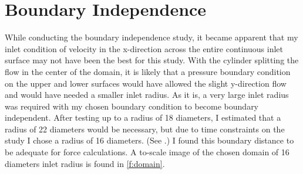 \documentclass[10pt,english]{article}
\begin{document}
\section{Boundary Independence}

While conducting the boundary independence study, it became apparent that my inlet condition of velocity in the x-direction across the entire continuous inlet surface may not have been the best for this study.  With the cylinder splitting the flow in the center of the domain, it is likely that a pressure boundary condition on the upper and lower surfaces would have allowed the slight y-direction flow and would have needed a smaller inlet radius.  As it is, a very large inlet radius was required with my chosen boundary condition to become boundary independent.  After testing up to a radius of 18 diameters, I estimated that a radius of 22 diameters would be necessary, but due to time constraints on the study I chose a radius of 16 diameters.  (See .)  I found this boundary distance to be adequate for force calculations.  A to-scale image of the chosen domain of 16 diameters inlet radius is found in \cref{f:domain}.
\end{document}
